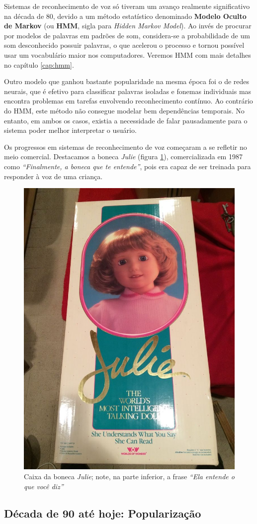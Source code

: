Sistemas de reconhecimento de voz só tiveram um avanço realmente significativo na década de 80, devido a um método estatístico denominado \textbf{Modelo Oculto de Markov} (ou \textbf{HMM}, sigla para \textit{Hidden Markov Model}). Ao invés de procurar por modelos de palavras em padrões de som, considera-se a probabilidade de um som desconhecido possuir palavras, o que acelerou o processo e tornou possível usar um vocabulário maior nos computadores. Veremos HMM com mais detalhes no capítulo \ref{cap:hmm}.

Outro modelo que ganhou bastante popularidade na mesma época foi o de redes neurais, que é efetivo para classificar palavras isoladas e fonemas individuais mas encontra problemas em tarefas envolvendo reconhecimento contínuo. Ao contrário do HMM, este método não consegue modelar bem dependências temporais. No entanto, em ambos os casos, existia a necessidade de falar pausadamente para o sistema poder melhor interpretar o usuário.

Os progressos em sistemas de reconhecimento de voz começaram a se refletir no meio comercial. Destacamos a boneca \textit{Julie} (figura \ref{julie}), comercializada em 1987 como \textit{``Finalmente, a boneca que te entende''}, pois era capaz de ser treinada para responder à voz de uma criança.

\begin{figure}[H]
  \centering
  \includegraphics[width=.35\textwidth]{image/julie.jpg}
  \caption{Caixa da boneca \textit{Julie}; note, na parte inferior, a frase \textit{``Ela entende o que você diz''} \citep{julieImage}}
  \label{julie}
\end{figure}


\subsection{Década de 90 até hoje: Popularização}

